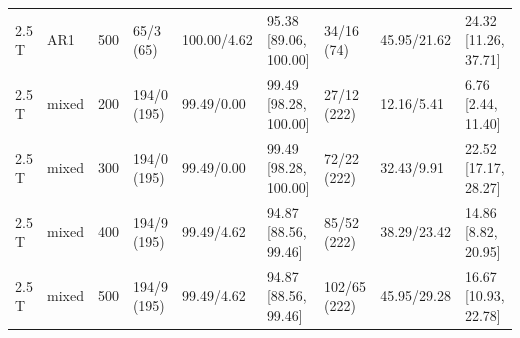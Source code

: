 \documentclass[10pt]{article}
\begin{document}
\begin{longtable}{@{}lllllllll@{}}
2.5 T & AR1 & 500 & 65/3 (65) & 100.00/4.62 & 95.38 [89.06, 100.00] & 34/16 (74) & 45.95/21.62 & 24.32 [11.26, 37.71] \\
2.5 T & mixed & 200 & 194/0 (195) & 99.49/0.00 & 99.49 [98.28, 100.00] & 27/12 (222) & 12.16/5.41 & 6.76 [2.44, 11.40] \\
2.5 T & mixed & 300 & 194/0 (195) & 99.49/0.00 & 99.49 [98.28, 100.00] & 72/22 (222) & 32.43/9.91 & 22.52 [17.17, 28.27] \\
2.5 T & mixed & 400 & 194/9 (195) & 99.49/4.62 & 94.87 [88.56, 99.46] & 85/52 (222) & 38.29/23.42 & 14.86 [8.82, 20.95] \\
2.5 T & mixed & 500 & 194/9 (195) & 99.49/4.62 & 94.87 [88.56, 99.46] & 102/65 (222) & 45.95/29.28 & 16.67 [10.93, 22.78] \\
\bottomrule\end{longtable}\endgroup\begingroup\footnotesize\setlength{\tabcolsep}{3pt}
\end{document}
